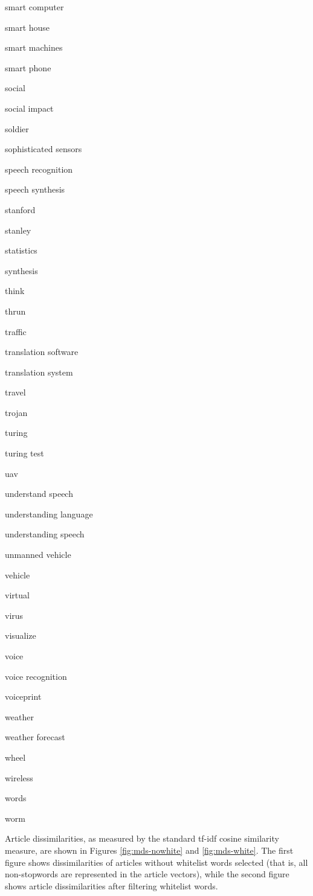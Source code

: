\documentclass{article}
\begin{document}
\begin{multicols}{3}
smart computer

smart house

smart machines

smart phone

social

social impact

soldier

sophisticated sensors

speech recognition

speech synthesis

stanford

stanley

statistics

synthesis

think

thrun

traffic

translation software

translation system

travel

trojan

turing

turing test

uav

understand speech

understanding language

understanding speech

unmanned vehicle

vehicle

virtual

virus

visualize

voice

voice recognition

voiceprint

weather

weather forecast

wheel

wireless

words

worm
\end{multicols}

Article dissimilarities, as measured by the standard tf-idf cosine similarity
measure, are shown in Figures \ref{fig:mds-nowhite} and \ref{fig:mds-white}.
The first figure shows dissimilarities of articles without whitelist words
selected (that is, all non-stopwords are represented in the article vectors),
while the second figure shows article dissimilarities after filtering whitelist
words.
\end{document}
